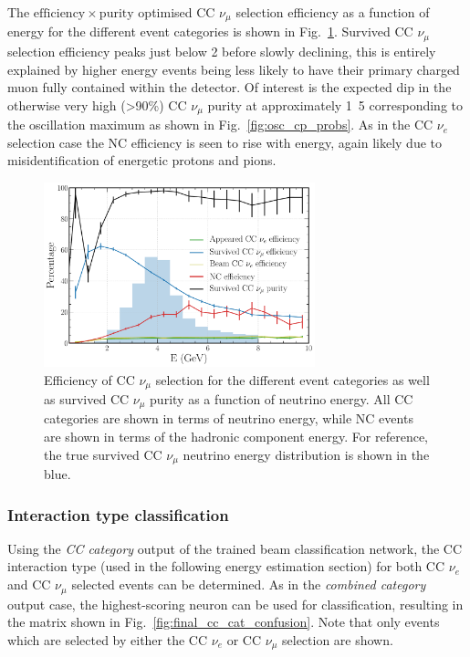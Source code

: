 The $\mathrm{efficiency}\times\mathrm{purity}$ optimised CC $\nu_{\mu}$ selection efficiency as a
function of energy for the different event categories is shown in Fig.~\ref{fig:final_numu_hists}.
Survived CC $\nu_{\mu}$ selection efficiency peaks just below \unit{2}{\GeV} before slowly
declining, this is entirely explained by higher energy events being less likely to have their
primary charged muon fully contained within the detector. Of interest is the expected dip in the
otherwise very high (>90\%) CC $\nu_{\mu}$ purity at approximately \unit{1.5}{\GeV} corresponding
to the oscillation maximum as shown in Fig.~\ref{fig:osc_cp_probs}. As in the CC $\nu_{e}$
selection case the NC efficiency is seen to rise with energy, again likely due to
misidentification of energetic protons and pions.

\begin{figure} %
    \includegraphics[width=0.7\textwidth]{diagrams/6-cvn/chipsnet/final_numu_hists.pdf}
    \caption[Efficiency of CC $\nu_{\mu}$ selection as a function of energy.]
    {Efficiency of CC $\nu_{\mu}$ selection for the different event categories as well as survived
        CC $\nu_{\mu}$ purity as a function of neutrino energy. All CC categories are shown in terms
        of neutrino energy, while NC events are shown in terms of the hadronic component energy. For
        reference, the true survived CC $\nu_{\mu}$ neutrino energy distribution is shown in the
        blue.}
    \label{fig:final_numu_hists}
\end{figure}

\subsubsection*{Interaction type classification} %

Using the \emph{CC category} output of the trained beam classification network, the CC interaction
type (used in the following energy estimation section) for both CC $\nu_{e}$ and CC $\nu_{\mu}$
selected events can be determined. As in the \emph{combined category} output case, the
highest-scoring neuron can be used for classification, resulting in the matrix shown in
Fig.~\ref{fig:final_cc_cat_confusion}. Note that only events which are selected by either the CC
$\nu_{e}$ or CC $\nu_{\mu}$ selection are shown.

